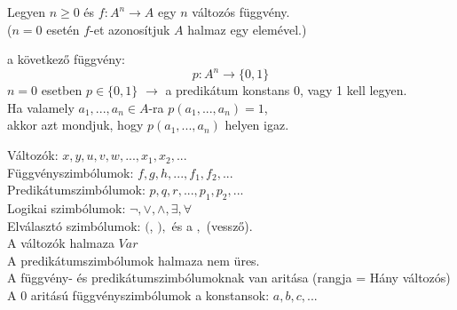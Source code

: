 \begin{frame}

\begin{tcolorbox}[title={Függvény}]
Legyen $n \geq 0$ és $f : A^n \rightarrow A$ egy $n$ változós függvény.\\
\tcblower
({\small $n = 0$ esetén $f$-et azonosítjuk $A$ halmaz egy elemével.})
\end{tcolorbox}

\begin{tcolorbox}[title={$A$ feletti n változó predikátum}]
 a következő függvény:\\
$$p : A^n \rightarrow \{0, 1\}$$
\tcblower
{\small $n = 0$ esetben $p \in \{0, 1\}$ $\rightarrow$  a predikátum konstans 0, vagy 1 kell legyen.}\\
\msmallskip
{\small Ha valamely $a_1, ..., a_n \in A$-ra $p (a_1, ..., a_n) = 1$},\\
{\small akkor azt mondjuk, hogy $p(a_1, ..., a_n)$ helyen igaz.}
\end{tcolorbox}

\begin{tcolorbox}[title={Az $\mathcal{L}$ elsőrendű nyelv szimbólumai}]
Változók: $x, y, u, v, w, ..., x_1, x_2, ...$\\
Függvényszimbólumok: $f, g, h, ..., f_1, f_2, ...$\\
Predikátumszimbólumok: $p, q, r, ..., p_1, p_2, ...$\\
Logikai szimbólumok: ${\neg}, {\lor}, {\land}, {\exists}, {\forall}$\\
Elválasztó szimbólumok: $($, $),$ és a $,$ (vessző).\\
\tcblower
A változók halmaza $Var$\\
A predikátumszimbólumok halmaza nem üres.\\
A függvény- és predikátumszimbólumoknak van aritása (rangja = Hány változós)\\
A 0 aritású függvényszimbólumok a konstansok: $a, b, c, ...$
\end{tcolorbox}
\end{frame}

